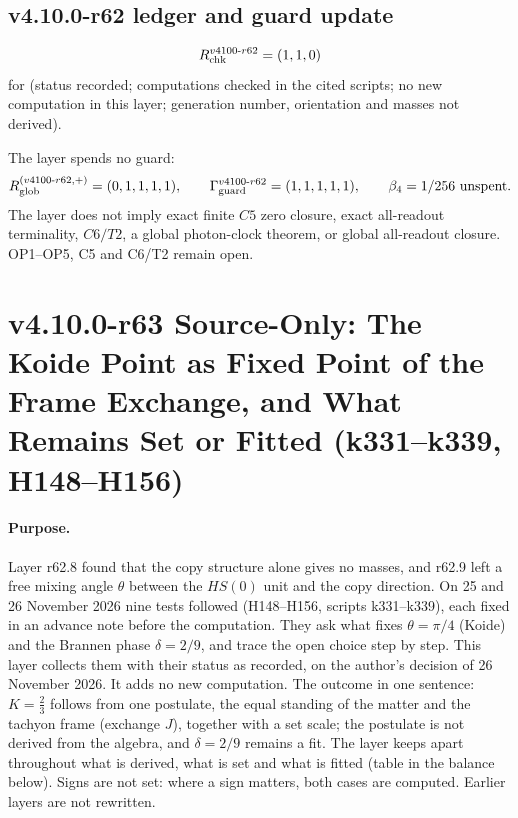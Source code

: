 \subsection*{v4.10.0-r62 ledger and guard update}
\label{subsec:v4100-r62-ledger-guard}

\[
R_{\rm chk}^{v4100\text{-}r62}=(1,1,0)
\]
for (status recorded; computations checked in the cited scripts; no new computation in this layer; generation number, orientation and masses not derived).

The layer spends no guard:
\[
R_{\rm glob}^{(v4100\text{-}r62,+)}=(0,1,1,1,1),
\qquad
\Gamma_{\rm guard}^{v4100\text{-}r62}=(1,1,1,1,1),
\qquad
\beta_4=1/256\ \text{unspent}.
\]
The layer does not imply exact finite \(C5\) zero closure, exact all-readout terminality, \(C6/T2\), a global photon-clock theorem,
or global all-readout closure.  OP1--OP5, C5 and C6/T2 remain open.

\clearpage
\section*{v4.10.0-r63 Source-Only: The Koide Point as Fixed Point of the Frame Exchange, and What Remains Set or Fitted (k331--k339, H148--H156)}
\label{sec:v4100-r63-koide-frame-exchange}

\paragraph{Purpose.}
Layer r62.8 found that the copy structure alone gives no masses, and r62.9 left a free mixing angle \(\theta\) between the \(HS(0)\) unit and
the copy direction.  On 25 and 26 November 2026 nine tests followed (H148--H156, scripts k331--k339), each fixed in an advance note before the
computation.  They ask what fixes \(\theta=\pi/4\) (Koide) and the Brannen phase \(\delta=2/9\), and trace the open choice step by step.  This
layer collects them with their status as recorded, on the author's decision of 26 November 2026.  It adds no new computation.  The outcome in one
sentence: \(K=\tfrac23\) follows from one postulate, the equal standing of the matter and the tachyon frame (exchange \(J\)), together with a set
scale; the postulate is not derived from the algebra, and \(\delta=2/9\) remains a fit.  The layer keeps apart throughout what is derived, what
is set and what is fitted (table in the balance below).  Signs are not set: where a sign matters, both cases are computed.  Earlier layers are
not rewritten.

